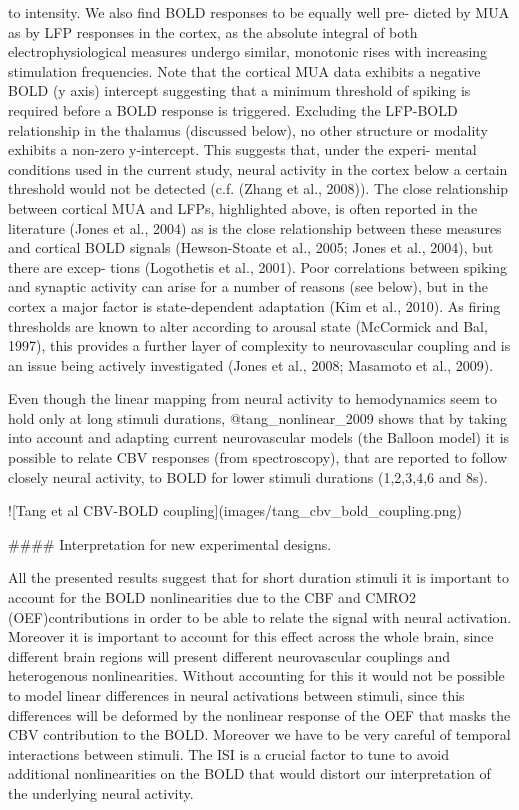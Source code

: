 to intensity. We also find BOLD responses to be equally well pre-
dicted by MUA as by LFP responses in the cortex, as the absolute
integral of both electrophysiological measures undergo similar,
monotonic rises with increasing stimulation frequencies. Note that
the cortical MUA data exhibits a negative BOLD (y axis) intercept
suggesting that a minimum threshold of spiking is required before
a BOLD response is triggered. Excluding the LFP-BOLD relationship
in the thalamus (discussed below), no other structure or modality
exhibits a non-zero y-intercept. This suggests that, under the experi-
mental conditions used in the current study, neural activity in the
cortex below a certain threshold would not be detected (c.f. (Zhang
et al., 2008)).
The close relationship between cortical MUA and LFPs, highlighted
above, is often reported in the literature (Jones et al., 2004) as is the
close relationship between these measures and cortical BOLD signals
(Hewson-Stoate et al., 2005; Jones et al., 2004), but there are excep-
tions (Logothetis et al., 2001). Poor correlations between spiking
and synaptic activity can arise for a number of reasons (see below),
but in the cortex a major factor is state-dependent adaptation (Kim
et al., 2010). As firing thresholds are known to alter according to
arousal state (McCormick and Bal, 1997), this provides a further
layer of complexity to neurovascular coupling and is an issue being
actively investigated (Jones et al., 2008; Masamoto et al., 2009).

Even though the linear mapping from neural activity to hemodynamics seem to hold only at long stimuli durations, @tang_nonlinear_2009 shows that by taking into account and adapting current neurovascular models (the Balloon model) it is possible to relate CBV responses (from spectroscopy), that are reported to follow closely neural activity, to BOLD for lower stimuli durations (1,2,3,4,6 and 8s).

![Tang et al CBV-BOLD coupling](images/tang_cbv_bold_coupling.png)

#### Interpretation for new experimental designs.

All the presented results suggest that for short duration stimuli it is important to account for the BOLD nonlinearities due to the CBF and CMRO2 (OEF)contributions in order to be able to relate the signal with neural activation. Moreover it is important to account for this effect across the whole brain, since different brain regions will present different neurovascular couplings and heterogenous nonlinearities. Without accounting for this it would not be possible to model linear differences in neural activations between stimuli, since this differences will be deformed by the nonlinear response of the OEF that masks the CBV contribution to the BOLD. Moreover we have to be very careful of temporal interactions between stimuli. The ISI is a crucial factor to tune to avoid additional nonlinearities on the BOLD that would distort our interpretation of the underlying neural activity.

